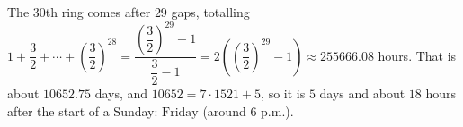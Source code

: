 The $30$th ring comes after $29$ gaps, totalling $1+\dfrac32+\cdots+\left(\dfrac32\right)^{28}=\dfrac{\left(\dfrac32\right)^{29}-1}{\dfrac32-1}=2\left(\left(\dfrac32\right)^{29}-1\right)\approx255666.08$ hours. That is about $10652.75$ days, and $10652=7\cdot1521+5$, so it is $5$ days and about $18$ hours after the start of a Sunday: $\boxed{\text{Friday}}$ (around 6 p.m.).
